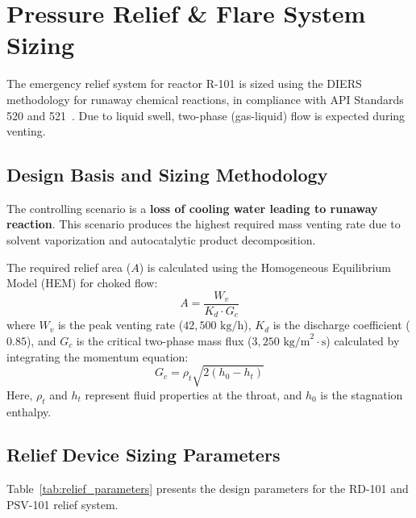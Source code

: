\section{Pressure Relief \& Flare System Sizing}
\label{sec:relief_sizing}

The emergency relief system for reactor R-101 is sized using the DIERS methodology for runaway chemical reactions, in compliance with API Standards 520 and 521~\cite{api520, api521}. Due to liquid swell, two-phase (gas-liquid) flow is expected during venting.

\subsection{Design Basis and Sizing Methodology}
The controlling scenario is a \textbf{loss of cooling water leading to runaway reaction}. This scenario produces the highest required mass venting rate due to solvent vaporization and autocatalytic product decomposition.

The required relief area ($A$) is calculated using the Homogeneous Equilibrium Model (HEM) for choked flow:
\begin{equation}
A = \frac{W_v}{K_d \cdot G_c}
\end{equation}
where $W_v$ is the peak venting rate ($42,500 \text{ kg/h}$), $K_d$ is the discharge coefficient ($0.85$), and $G_c$ is the critical two-phase mass flux ($3,250 \text{ kg/m}^2\cdot\text{s}$) calculated by integrating the momentum equation:
\begin{equation}
G_c = \rho_t \sqrt{2 (h_0 - h_t)}
\end{equation}
Here, $\rho_t$ and $h_t$ represent fluid properties at the throat, and $h_0$ is the stagnation enthalpy.

\subsection{Relief Device Sizing Parameters}
Table~\ref{tab:relief_parameters} presents the design parameters for the RD-101 and PSV-101 relief system.

